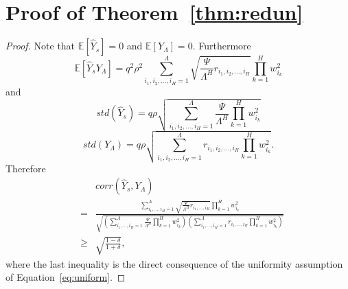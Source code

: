 \documentclass[twoside]{article}
\begin{document}
\section{Proof of Theorem~\ref{thm:redun}}
\begin{proof}
Note that $\mathbb{E}[\hat{Y}_s] = 0$ and $\mathbb{E}[Y_{\Lambda}] = 0$. Furthermore
\[\mathbb{E}[\hat{Y}_sY_{\Lambda}] = q^2\rho^2\sum_{i_1,i_2,\dots,i_H=1}^{\Lambda}\sqrt{\frac{\Psi}{\Lambda^H}r_{i_1,i_2,\dots,i_H}}\prod_{k = 1}^{H}w_{i_k}^2
\]
and
\[std(\hat{Y}_s) = q\rho\sqrt{\sum_{i_1,i_2,\dots,i_H=1}^{\Lambda}\frac{\Psi}{\Lambda^H}\prod_{k = 1}^{H}w_{i_k}^2}
\]
\[std(Y_{\Lambda}) = q\rho\sqrt{\sum_{i_1,i_2,\dots,i_H=1}^{\Lambda}r_{i_1,i_2,\dots,i_H}\prod_{k = 1}^{H}w_{i_k}^2}.
\]
Therefore
\begin{eqnarray*}
&&\!\!\!\!\!\!\!\!\!corr(\hat{Y}_s,Y_{\Lambda})\\ 
&\!\!\!\!\!\!\!\!\!=&\!\!\!\!\!\!\! \frac{\displaystyle\sum_{i_1,\dots,i_H=1}^{\Lambda}\sqrt{\frac{\Psi}{\Lambda^H}r_{i_1,\dots,i_H}}\prod_{k = 1}^{H}w_{i_k}^2}{\sqrt{\!\!\!\left(\displaystyle\sum_{i_1,\dots,i_H=1}^{\Lambda}\frac{\Psi}{\Lambda^H}\prod_{k = 1}^{H}w_{i_k}^2\right)\!\!\!\!\left(\displaystyle\sum_{i_1,\dots,i_H=1}^{\Lambda}\!\!\!\!\!r_{i_1,\dots,i_H}\prod_{k = 1}^{H}w_{i_k}^2\right)}}\\
&\!\!\!\!\!\!\!\!\geq& \sqrt{\frac{1-\delta}{1+\delta}}, 
\end{eqnarray*}
where the last inequality is the direct consequence of the uniformity assumption of Equation~\ref{eq:uniform}.
\end{proof}
\end{document}
